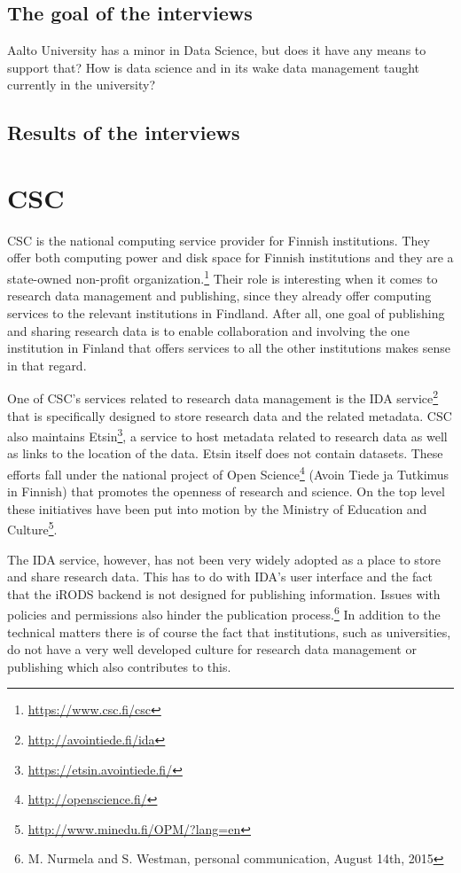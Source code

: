 \subsection{The goal of the interviews}

Aalto University has a minor in Data Science, but does it have any means to
support that? How is data science and in its wake data management taught
currently in the university?

\subsection{Results of the interviews}

\fi

\section{CSC}
\label{sec:csc}

CSC is the national computing service provider for Finnish institutions. They
offer both computing power and disk space for Finnish institutions and they
are a state-owned non-profit organization.\footnote{\url{https://www.csc.fi/csc}}
Their role is interesting when it comes to research data management and
publishing, since they already offer computing services to the relevant
institutions in Findland. After all, one goal of publishing and sharing
research data is to enable collaboration and involving the one institution
in Finland that offers services to all the other institutions makes sense in
that regard.

One of CSC's services related to research data management is the IDA
service\footnote{\url{http://avointiede.fi/ida}} that is specifically
designed to store research data and the related metadata. CSC also maintains
Etsin\footnote{\url{https://etsin.avointiede.fi/}}, a service to host
metadata related to research data as well as links to the location of the data.
Etsin itself does not contain datasets.
These efforts fall under the national project of Open
Science\footnote{\url{http://openscience.fi/}} (Avoin Tiede ja Tutkimus in
Finnish) that promotes the openness of research and science. On the top level
these initiatives have been put into motion by the Ministry of Education and
Culture\footnote{\url{http://www.minedu.fi/OPM/?lang=en}}.

The IDA service, however, has not been very widely adopted as a place to store
and share research data. This has to do with IDA's user interface and the fact
that the iRODS backend is not designed for publishing information. Issues with
policies and permissions also hinder the publication process.\footnote{M.
Nurmela and S. Westman, personal communication, August 14th, 2015} In addition
to the technical matters there is of course the fact that institutions, such as
universities, do not have a very well developed culture for research data
management or publishing which also contributes to this.

